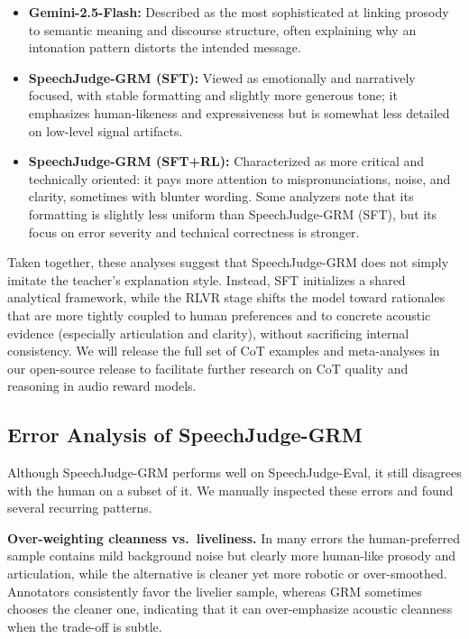 \documentclass[]{bytedance_seed}
\begin{document}
\begin{itemize}[itemsep=0ex,leftmargin=3ex]
\item \textbf{Gemini-2.5-Flash:}
  Described as the most sophisticated at linking prosody to {semantic}
  meaning and discourse structure, often explaining {why} an intonation
  pattern distorts the intended message.
\item \textbf{SpeechJudge-GRM (SFT):}
  Viewed as emotionally and narratively focused, with stable formatting and
  slightly more generous tone; it emphasizes human-likeness and expressiveness
  but is somewhat less detailed on low-level signal artifacts.
\item \textbf{SpeechJudge-GRM (SFT+RL):}
  Characterized as more critical and technically oriented: it pays more
  attention to mispronunciations, noise, and clarity, sometimes with blunter
  wording. Some analyzers note that its formatting is slightly less uniform
  than SpeechJudge-GRM (SFT), but its focus on error severity and technical correctness is
  stronger.
\end{itemize}

Taken together, these analyses suggest that SpeechJudge-GRM does not simply
imitate the teacher’s explanation style.
Instead, SFT initializes a shared analytical framework, while the RLVR stage
shifts the model toward rationales that are more tightly coupled to human
preferences and to concrete acoustic evidence
(especially articulation and clarity), without sacrificing internal
consistency.
We will release the full set of CoT examples and meta-analyses in our
open-source release to facilitate further research on CoT quality and
reasoning in audio reward models.

\subsection{Error Analysis of SpeechJudge-GRM}
\label{app:grm-error}

Although SpeechJudge-GRM performs well on {SpeechJudge-Eval}, it still
disagrees with the human on a subset of it.
We manually inspected these errors and found several recurring patterns.

\textbf{Over-weighting cleanness vs.\ liveliness.}\quad
In many errors the human-preferred sample contains mild background noise but clearly more human-like prosody and articulation, while the alternative
is cleaner yet more robotic or over-smoothed.
Annotators consistently favor the livelier sample, whereas GRM sometimes
chooses the cleaner one, indicating that it can over-emphasize acoustic
cleanness when the trade-off is subtle.
\end{document}
